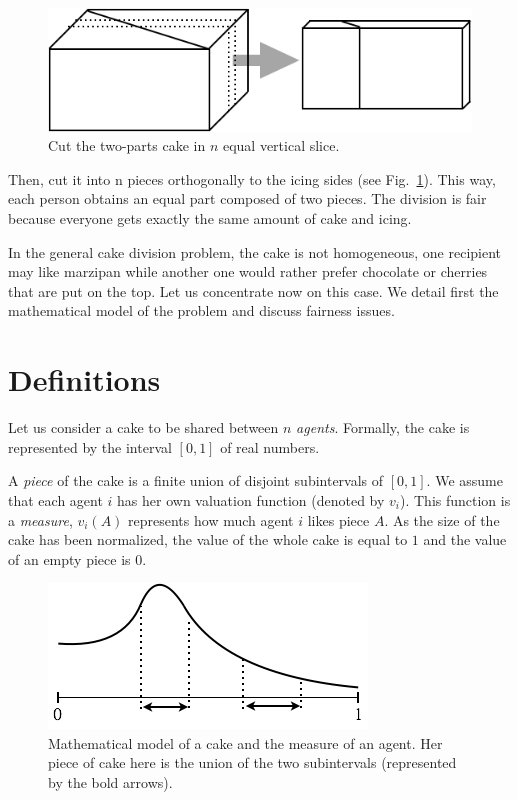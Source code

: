 \begin{itemize}
\begin{figure}[htb]
\begin{center}
        \includegraphics[scale=0.4]{FiguresMaths/CakeHomogeneous3}
        \caption{Cut the two-parts cake in $n$ equal vertical slice.}
        \label{Fig:cakeHomogeneous3}
\end{center}
\end{figure}
Then, cut it into n pieces orthogonally to the icing sides (see Fig.~\ref{Fig:cakeHomogeneous3}). 
This way, each person obtains an equal part composed of two pieces. 
The division is fair because everyone gets exactly the same amount of cake and icing. 
\end{itemize}

In the general cake division problem, the cake is not homogeneous, 
one recipient may like marzipan while another one would rather prefer chocolate or cherries
that are put on the top.
Let us concentrate now on this case.
We detail first the mathematical model of the problem and discuss fairness issues. 


\section{Definitions}

Let us consider a cake to be shared between $n$ \textit{agents}. 
Formally, the cake is represented by the interval $[0,1]$ of real numbers.

A \textit{piece} of the cake is a finite union of disjoint subintervals of $[0,1]$.
We assume that each agent $i$ has her own valuation function (denoted by $v_i$).
This function is a \textit{measure}, $v_i(A)$ represents how much agent $i$ likes piece $A$. 
As the size of the cake has been normalized, the value of the whole cake is equal to $1$
and the value of an empty piece is $0$.
\begin{figure}[htb]
\begin{center}
        \includegraphics[scale=0.5]{FiguresMaths/cakeMeasure}
        \caption{Mathematical model of a cake and the measure of an agent. 
        Her piece of cake here is the union of the two subintervals 
        (represented by the bold arrows).}
        \label{Fig:cakeMeasure}
\end{center}
\end{figure}

